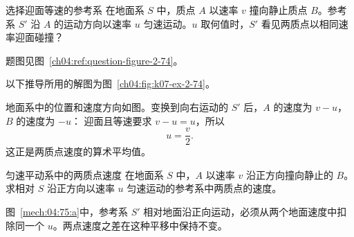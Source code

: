 {\begin{origexamplebox}{选择迎面等速的参考系}\label{ch04:ex:k07-2-74}
在地面系 $S$ 中，质点 $A$ 以速率 $v$ 撞向静止质点 $B$。参考系 $S'$ 沿 $A$ 的运动方向以速率 $u$ 匀速运动。$u$ 取何值时，$S'$ 看见两质点以相同速率迎面碰撞？
\par 题图见图~\ref{ch04:ref:question-figure-2-74}。
\KQuestionCW
\end{origexamplebox}
\begin{xesolution}
以下推导所用的解图为图~\ref{ch04:fig:k07-ex-2-74}。

地面系中的位置和速度方向如图。变换到向右运动的 $S'$ 后，$A$ 的速度为 $v-u$，$B$ 的速度为 $-u$：
\EqualSpeedFrameDiagram
迎面且等速要求 $v-u=u$，所以
\[
\boxed{u=\frac v2}.
\]
这正是两质点速度的算术平均值。
\end{xesolution}

\begin{origexamplebox}{匀速平动系中的两质点速度}\label{ch04:ex:k07-2-75}
在地面系 $S$ 中，$A$ 以速率 $v$ 沿正方向撞向静止的 $B$。求相对 $S$ 沿正方向以速率 $u$ 匀速运动的参考系中两质点的速度。

\begin{qualityfigure}
\label{mech:04:75:q}
\end{qualityfigure}
\end{origexamplebox}
\begin{xesolution}
\begin{qualityfigure}
\label{mech:04:75:a}
\end{qualityfigure}
图~\ref{mech:04:75:a}中，参考系 $S'$ 相对地面沿正向运动，必须从两个地面速度中扣除同一个 $u$。两点速度之差在这种平移中保持不变。


\end{xesolution}}
